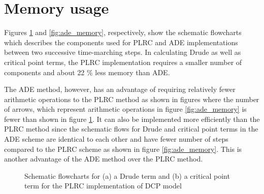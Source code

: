 \section{Memory usage}
Figures \ref{fig:plrc_memory} and \ref{fig:ade_memory}, respectively, show the schematic flowcharts which describes the components used for PLRC and ADE implementations between two successive time-marching steps. In calculating Drude as well as critical point terms, the PLRC implementation requires a smaller number of components and about 22 \% less memory than ADE. 

The ADE method, however, has an advantage of requiring relatively fewer arithmetic operations to the PLRC method as shown in figures where the number of arrows, which represent arithmetic operations in figure \ref{fig:ade_memory} is fewer than shown in figure \ref{fig:plrc_memory}. It can also be implemented more efficiently than the PLRC method since the schematic flows for Drude and critical point terms in the ADE scheme are identical to each other and have fewer number of steps compared to the PLRC scheme as shown in figure \ref{fig:ade_memory}. This is another advantage of the ADE method over the PLRC method.
\begin{figure}[hp!]
  \begin{center}
  \end{center}
  \caption{Schematic flowcharts for (a) a Drude term and (b) a critical point term for the PLRC implementation of DCP model}
  \label{fig:plrc_memory}
\end{figure}


